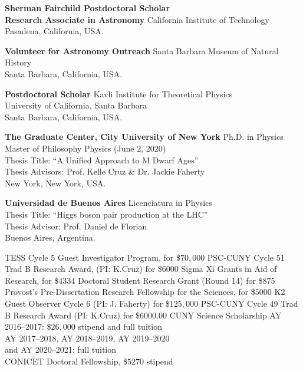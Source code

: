 \documentclass[10pt]{cv}
\newcommand\tab[1][1cm]{\hspace*{#1}}
\begin{document}
\begin{llist}


\textbf{Sherman Fairchild Postdoctoral Scholar\\Research Associate in Astronomy}
California Institute of Technology \\
Pasadena, California, USA.

\textbf{Volunteer for Astronomy Outreach}
Santa Barbara Museum of Natural History \\
Santa Barbara, California, USA.


\textbf{Postdoctoral Scholar}
Kavli Institute for Theoretical Physics \\
University of California, Santa Barbara \\
Santa Barbara, California, USA.


\textbf{The Graduate Center, City University of New York}
Ph.D. in Physics\\
Master of Philosophy Physics (June 2, 2020)\\
Thesis Title: ``A Unified Approach to M Dwarf Ages''\\
Thesis Advisors: Prof. Kelle Cruz \& Dr. Jackie Faherty \\
New York, New York, USA.

\textbf{Universidad de Buenos Aires}
Licenciatura in Physics\\
Thesis Title: ``Higgs boson pair production at the LHC''\\
Thesis Advisor: Prof. Daniel de Florian\\
Buenos Aires, Argentina.




TESS Cycle 5 Guest Investigator Program, for \$$70,000$
PSC-CUNY Cycle 51 Trad B Research Award, (PI: K.Cruz) for \$$6000$
Sigma Xi Grants in Aid of Research, for \$$4334$
Doctoral Student Research Grant (Round 14) for \$$875$    
Provost’s Pre-Dissertation Research Fellowship for the Sciences, for \$$5000$
K2 Guest Observer Cycle 6 (PI: J. Faherty) for \$$125,000$
PSC-CUNY Cycle 49 Trad B Research Award (PI: K.Cruz) for \$$6000.00$
CUNY Science Scholarship
\tab AY 2016–2017: \$$26,000$ stipend and full tuition\\
\tab AY 2017–2018, AY 2018–2019, AY 2019–2020\\ 
\tab and AY 2020–2021: full tuition\\
CONICET Doctoral Fellowship, \$$5270$ stipend



\end{llist}
\end{document}
